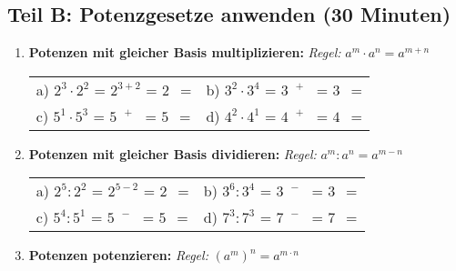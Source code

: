 \subsection*{Teil B: Potenzgesetze anwenden (30 Minuten)}

\begin{enumerate}[label=\arabic*.]

    \item \textbf{Potenzen mit gleicher Basis multiplizieren:}
    \textit{Regel:} $a^m \cdot a^n = a^{m+n}$
    \vspace{0.5cm}

    \begin{tabular}{ll}
        a) $2^3 \cdot 2^2$ = $2^{3+2}$ = $2^{\phantom{0}}$ = \underline{\hspace{3cm}} & b) $3^2 \cdot 3^4$ = $3^{\phantom{0}+\phantom{0}}$ = $3^{\phantom{0}}$ = \underline{\hspace{3cm}} \\[3ex]
        c) $5^1 \cdot 5^3$ = $5^{\phantom{0}+\phantom{0}}$ = $5^{\phantom{0}}$ = \underline{\hspace{3cm}} & d) $4^2 \cdot 4^1$ = $4^{\phantom{0}+\phantom{0}}$ = $4^{\phantom{0}}$ = \underline{\hspace{3cm}}
    \end{tabular}

    \vspace{1cm}

    \item \textbf{Potenzen mit gleicher Basis dividieren:}
    \textit{Regel:} $a^m : a^n = a^{m-n}$
    \vspace{0.5cm}

    \begin{tabular}{ll}
        a) $2^5 : 2^2$ = $2^{5-2}$ = $2^{\phantom{0}}$ = \underline{\hspace{3cm}} & b) $3^6 : 3^4$ = $3^{\phantom{0}-\phantom{0}}$ = $3^{\phantom{0}}$ = \underline{\hspace{3cm}} \\[3ex]
        c) $5^4 : 5^1$ = $5^{\phantom{0}-\phantom{0}}$ = $5^{\phantom{0}}$ = \underline{\hspace{3cm}} & d) $7^3 : 7^3$ = $7^{\phantom{0}-\phantom{0}}$ = $7^{\phantom{0}}$ = \underline{\hspace{3cm}}
    \end{tabular}

    \vspace{1cm}

    \item \textbf{Potenzen potenzieren:}
    \textit{Regel:} $(a^m)^n = a^{m \cdot n}$
    \vspace{0.5cm}


\end{enumerate}
